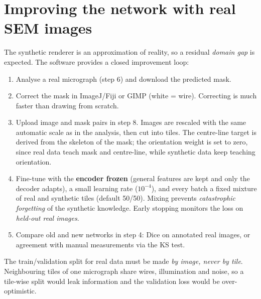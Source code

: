 \documentclass[11pt,a4paper]{article}
\begin{document}
\section{Improving the network with real SEM images}\label{sec:finetune}
The synthetic renderer is an approximation of reality, so a residual \emph{domain gap} is expected. The software provides a closed improvement loop:
\begin{enumerate}[leftmargin=*,itemsep=1pt]
\item Analyse a real micrograph (step 6) and download the predicted mask.
\item Correct the mask in ImageJ/Fiji or GIMP (white = wire). Correcting is much faster than drawing from scratch.
\item Upload image and mask pairs in step 8. Images are rescaled with the same automatic scale as in the analysis, then cut into tiles. The centre-line target is derived from the skeleton of the mask; the orientation weight is set to zero, since real data teach mask and centre-line, while synthetic data keep teaching orientation.
\item Fine-tune with the \textbf{encoder frozen} (general features are kept and only the decoder adapts), a small learning rate ($10^{-4}$), and every batch a fixed mixture of real and synthetic tiles (default 50/50). Mixing prevents \emph{catastrophic forgetting} of the synthetic knowledge. Early stopping monitors the loss on \emph{held-out real images}.
\item Compare old and new networks in step 4: Dice on annotated real images, or agreement with manual measurements via the KS test.
\end{enumerate}
The train/validation split for real data must be made \emph{by image, never by tile}. Neighbouring tiles of one micrograph share wires, illumination and noise, so a tile-wise split would leak information and the validation loss would be over-optimistic.

\end{document}
